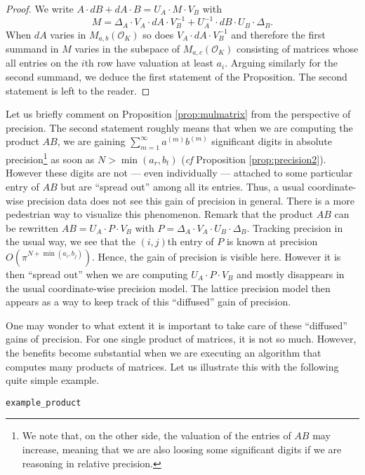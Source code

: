 \documentclass{sig-alternate}
\renewcommand{\O}{\mathcal O}
\begin{document}
\begin{proof}
We write $A \cdot dB + dA \cdot B = U_A \cdot M \cdot V_B$ with
$$M = \Delta_A \cdot V_A \cdot dA \cdot V_B^{-1} 
+ U_A^{-1} \cdot dB \cdot U_B \cdot \Delta_B.$$
When $dA$ varies in $M_{a,b}(\O_K)$ so does $V_A \cdot dA \cdot V_B^{-1}$
and therefore the first summand in $M$ varies in the subspace of 
$M_{a,c}(\O_K)$ consisting of matrices whose all entries on the $i$th
row have valuation at least $a_i$. Arguing similarly for the second
summand, we deduce the first statement of the Proposition. The second
statement is left to the reader.
\end{proof}

Let us briefly comment on Proposition \ref{prop:mulmatrix} from the 
perspective of precision. The second statement roughly means that when 
we are computing the product $AB$, we are gaining $\sum_{m=1}^\infty 
a^{(m)} b^{(m)}$ significant digits in absolute precision\footnote{We 
note that, on the other side, the valuation of the entries of $AB$ may 
increase, meaning that we are also loosing some significant digits if we 
are reasoning in relative precision.} as soon as $N > \min(a_r, b_t)$ 
(\emph{cf} Proposition \ref{prop:precision2}). However these digits are 
not --- even individually --- attached to some particular entry of $AB$ 
but are ``spread out'' among all its entries. Thus, a usual 
coordinate-wise precision data does not see this gain of precision in 
general. There is a more pedestrian way to visualize this phenomenon. 
Remark that the product $AB$ can be rewritten
$AB = U_A \cdot P \cdot V_B$ with
$P = \Delta_A \cdot V_A \cdot U_B \cdot \Delta_B$.
Tracking precision in the usual way, we see that the $(i,j)$th entry
of $P$ is known at precision $O(\pi^{N + \min(a_i,b_j)})$. Hence, the 
gain of precision is visible here. However it is then ``spread out'' 
when we are computing $U_A \cdot P \cdot V_B$ and mostly disappears in 
the usual coordinate-wise precision model. The lattice precision model 
then appears as a way to keep track of this ``diffused'' gain of
precision.

One may wonder to what extent it is important to take care of these 
``diffused'' gains of precision. For one single product of matrices, 
it is not so much. However, the benefits become substantial
when we are executing an algorithm that computes many products of
matrices. Let us illustrate this with the following quite simple
example.

\noindent\hrulefill

 {\tt example\_product}
\end{document}
